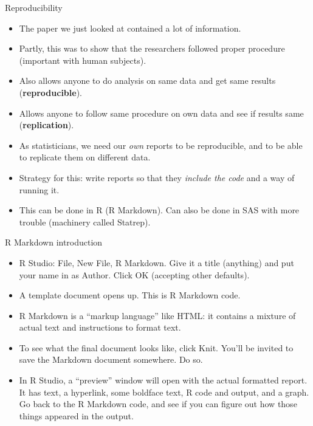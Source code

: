 \documentclass[unknownkeysallowed]{beamer}\usepackage[]{graphicx}\usepackage[]{color}
\begin{document}
\begin{frame}[fragile]{Reproducibility}
  
  \begin{itemize}
  \item The paper we just looked at contained a lot of information.
  \item Partly, this was to show that the researchers followed proper
    procedure (important with human subjects).
  \item Also allows anyone to do analysis on same data and get same
    results (\textbf{reproducible}).
  \item Allows anyone to follow same procedure on own data and see if
    results same (\textbf{replication}). 
  \item As statisticians, we need our \emph{own} reports to be
    reproducible, and to be able to replicate them on different data.
  \item Strategy for this: write reports so that they \emph{include
      the code} and a way of running it.
  \item This can be done in R (R Markdown). Can also be done in SAS
    with more trouble (machinery called Statrep).
  \end{itemize}
  
\end{frame}

\begin{frame}[fragile]{R Markdown introduction}
  
  \begin{itemize}
  \item R Studio: File, New File, R Markdown. Give it a title
    (anything) and put your name in as Author. Click OK (accepting
    other defaults).
  \item A template document opens up. This is R Markdown code.
  \item R Markdown is a ``markup language'' like HTML: it contains a
    mixture of actual text and instructions to format text.
  \item To see what the final document looks like, click Knit. You'll
    be invited to save the Markdown document somewhere. Do so.
  \item In R Studio, a ``preview'' window will open with the actual
    formatted report. It has text, a hyperlink, some boldface text, R
    code and output, and a graph. Go back to the R Markdown code, and
    see if you can figure out how those things appeared in the output.
  \end{itemize}
  
\end{frame}
\end{document}
